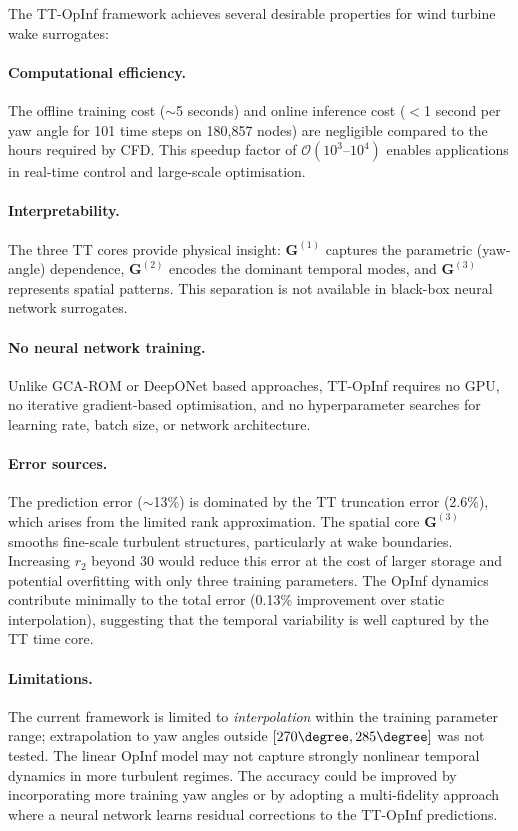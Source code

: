 \documentclass[12pt]{article}
\newcommand{\mat}[1]{\mathbf{#1}}
\begin{document}
The TT-OpInf framework achieves several desirable properties for wind turbine wake surrogates:

\paragraph{Computational efficiency.}
The offline training cost ($\sim$5 seconds) and online inference cost ($<$1 second per yaw angle for 101 time steps on 180{,}857 nodes) are negligible compared to the hours required by CFD.
This speedup factor of $\mathcal{O}(10^3\text{--}10^4)$ enables applications in real-time control and large-scale optimisation.

\paragraph{Interpretability.}
The three TT cores provide physical insight: $\mat{G}^{(1)}$ captures the parametric (yaw-angle) dependence, $\mat{G}^{(2)}$ encodes the dominant temporal modes, and $\mat{G}^{(3)}$ represents spatial patterns.
This separation is not available in black-box neural network surrogates.

\paragraph{No neural network training.}
Unlike GCA-ROM \citep{Chen2024} or DeepONet \citep{Lu2021deeponet} based approaches, TT-OpInf requires no GPU, no iterative gradient-based optimisation, and no hyperparameter searches for learning rate, batch size, or network architecture.

\paragraph{Error sources.}
The prediction error ($\sim$13\%) is dominated by the TT truncation error (2.6\%), which arises from the limited rank approximation.
The spatial core $\mat{G}^{(3)}$ smooths fine-scale turbulent structures, particularly at wake boundaries.
Increasing $r_2$ beyond 30 would reduce this error at the cost of larger storage and potential overfitting with only three training parameters.
The OpInf dynamics contribute minimally to the total error (0.13\% improvement over static interpolation), suggesting that the temporal variability is well captured by the TT time core.

\paragraph{Limitations.}
The current framework is limited to \emph{interpolation} within the training parameter range; extrapolation to yaw angles outside $[270\degree, 285\degree]$ was not tested.
The linear OpInf model may not capture strongly nonlinear temporal dynamics in more turbulent regimes.
The accuracy could be improved by incorporating more training yaw angles or by adopting a multi-fidelity approach where a neural network learns residual corrections to the TT-OpInf predictions.
\end{document}
